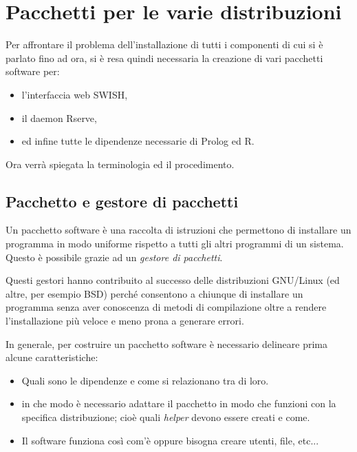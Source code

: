 \documentclass[10pt,titlepage,twoside,a4paper]{report}
\begin{document}
\chapter{Pacchetti per le varie distribuzioni} 
\label{ch:pacchetti-per-le-varie-distribuzioni}
Per affrontare il problema dell'installazione di tutti i componenti di cui si 
è parlato fino ad ora, si è resa quindi necessaria la creazione di vari 
pacchetti software per:
\begin{itemize}
    \item l'interfaccia web SWISH,
    \item il daemon Rserve,
    \item ed infine tutte le dipendenze necessarie di Prolog ed R.
\end{itemize}

Ora verrà spiegata la terminologia ed il procedimento.


\section{Pacchetto e gestore di pacchetti} \label{pacchetto-e-gestore-di-pacchetti}
Un pacchetto software è una raccolta di istruzioni che permettono di 
installare un programma in modo uniforme rispetto a tutti gli altri programmi 
di un sistema. Questo è possibile grazie ad un \emph{gestore di 
pacchetti}.

Questi gestori hanno contribuito al successo delle distribuzioni GNU/Linux (ed 
altre, per esempio BSD) perché consentono a chiunque di installare un 
programma senza aver conoscenza di metodi di compilazione oltre a rendere 
l'installazione più veloce e meno prona a generare errori.

In generale, per costruire un pacchetto software è necessario delineare prima 
alcune caratteristiche:
\begin{itemize}
    \item Quali sono le dipendenze e come si relazionano tra di loro.
    \item in che modo è necessario adattare il pacchetto in modo che funzioni 
          con la specifica distribuzione; cioè quali \emph{helper} devono 
essere creati e come.
    \item Il software funziona così com'è oppure bisogna creare utenti, 
file, etc...
\end{itemize}
\end{document}
